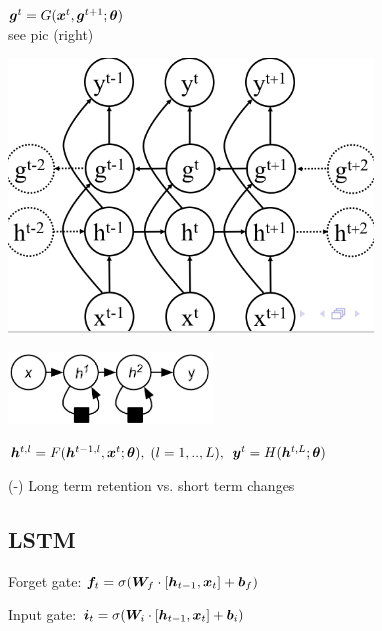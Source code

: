 \begin{multicols}{2}
$\boldsymbol{g}^t=G(\boldsymbol{x}^t,\boldsymbol{g}^{t+1};\boldsymbol{\theta})$\\
see pic (right)

\includegraphics[width=\textwidth/11
]{ETH-DS-2020/AML/Resources/bi-directional.png}
\end{multicols}
\begin{multicols}{2}
\includegraphics[width=\textwidth/9
]{ETH-DS-2020/AML/Resources/hierarchical2.png}

$\boldsymbol{h}^{t,l}=F(\boldsymbol{h}^{t-1,l},\boldsymbol{x}^{t};\boldsymbol{\theta}),\; (l=1,..,L),$ $\boldsymbol{y}^t=H(\boldsymbol{h}^{t,L};\boldsymbol{\theta})$
\end{multicols}
(-) Long term retention vs. short term changes

\subsection*{LSTM}
Forget gate: $\boldsymbol{f}_t=\sigma(\boldsymbol{W}_f\cdot[\boldsymbol{h}_{t-1},\boldsymbol{x}_t]+\boldsymbol{b}_f)$

Input gate: $\boldsymbol{i}_t=\sigma(\boldsymbol{W}_i\cdot[\boldsymbol{h}_{t-1},\boldsymbol{x}_t]+\boldsymbol{b}_i)$

